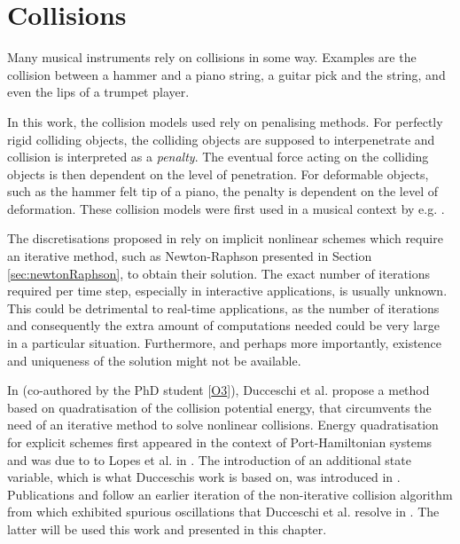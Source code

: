 \chapter{Collisions}\label{ch:collisions}
Many musical instruments rely on collisions in some way. Examples are the collision between a hammer and a piano string, a guitar pick and the string, and even the lips of a trumpet player. 

In this work, the collision models used rely on penalising methods. For perfectly rigid colliding objects, the colliding objects are supposed to interpenetrate and collision is interpreted as a \textit{penalty}. The eventual force acting on the colliding objects is then dependent on the level of penetration. For deformable objects, such as the hammer felt tip of a piano, the penalty is dependent on the level of deformation. These collision models were first used in a musical context by e.g. \cite{Chatziioannou2013, Bilbao2014}.

The discretisations proposed in \cite{Chatziioannou2013, Bilbao2014} rely on implicit nonlinear schemes which require an iterative method, such as Newton-Raphson presented in Section \ref{sec:newtonRaphson}, to obtain their solution. 
The exact number of iterations required per time step, especially in interactive applications, is usually unknown. This could be detrimental to real-time applications, as the number of iterations and consequently the extra amount of computations needed could be very large in a particular situation. Furthermore, and perhaps more importantly, existence and uniqueness of the solution might not be available. 

In \cite{Ducceschi2021} (co-authored by the PhD student [\hyperref[ch:listOfPublications]{O3}]), Ducceschi et al. propose a method based on quadratisation of the collision potential energy, that circumvents the need of an iterative method to solve nonlinear collisions. Energy quadratisation for explicit schemes first appeared in the context of Port-Hamiltonian systems and was due to to Lopes et al. in \cite{Lopes2015}. The introduction of an additional state variable, which is what Ducceschis work is based on, was introduced in \cite{Yang2017, Jiang2019}. Publications \citeP[D] and \citeP[E] follow an earlier iteration of the non-iterative collision algorithm from \cite{Ducceschi2019, Bilbao2019} which exhibited spurious oscillations that Ducceschi et al. resolve in \cite{Ducceschi2021}. The latter will be used this work and presented in this chapter. 

